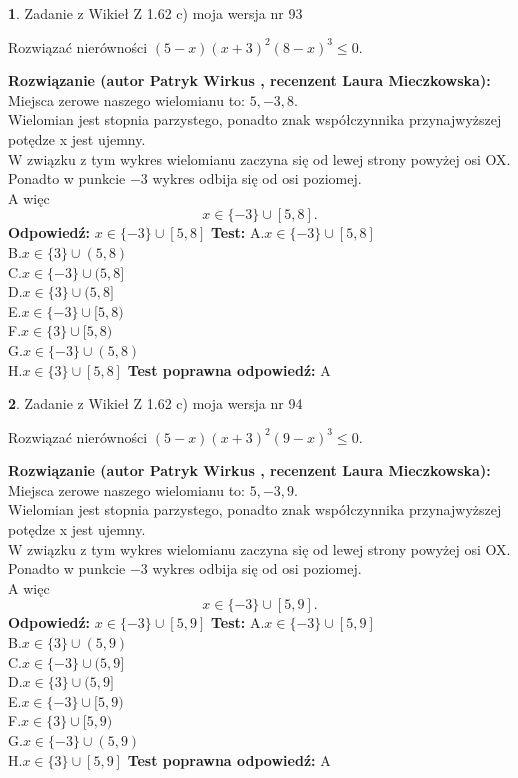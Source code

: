 \documentclass[12pt, a4paper]{article}
\theoremstyle{definition} %
\newtheorem{zad}{}
\newcommand{\zadStart}[1]{\begin{zad}#1\newline}
\newcommand{\zadStop}{\end{zad}}
\newcommand{\rozwStart}[2]{\noindent \textbf{Rozwiązanie (autor #1 , recenzent #2): }\newline}
\newcommand{\rozwStop}{\newline}
\newcommand{\odpStart}{\noindent \textbf{Odpowiedź:}\newline}
\newcommand{\odpStop}{\newline}
\newcommand{\testStart}{\noindent \textbf{Test:}\newline}
\newcommand{\testStop}{\newline}
\newcommand{\kluczStart}{\noindent \textbf{Test poprawna odpowiedź:}\newline}
\newcommand{\kluczStop}{\newline}
\begin{document}
\zadStart{Zadanie z Wikieł Z 1.62 c) moja wersja nr 93}

Rozwiązać nierówności $(5-x)(x+3)^{2}(8-x)^{3}\le0$.
\zadStop
\rozwStart{Patryk Wirkus}{Laura Mieczkowska}
Miejsca zerowe naszego wielomianu to: $5, -3, 8$.\\
Wielomian jest stopnia parzystego, ponadto znak współczynnika przy\linebreak najwyższej potędze x jest ujemny.\\ W związku z tym wykres wielomianu zaczyna się od lewej strony powyżej osi OX.\\
Ponadto w punkcie $-3$ wykres odbija się od osi poziomej.\\
A więc $$x \in \{-3\} \cup [5,8].$$
\rozwStop
\odpStart
$x \in \{-3\} \cup [5,8]$
\odpStop
\testStart
A.$x \in \{-3\} \cup [5,8]$\\
B.$x \in \{3\} \cup (5,8)$\\
C.$x \in \{-3\} \cup (5,8]$\\
D.$x \in \{3\} \cup (5,8]$\\
E.$x \in \{-3\} \cup [5,8)$\\
F.$x \in \{3\} \cup [5,8)$\\
G.$x \in \{-3\} \cup (5,8)$\\
H.$x \in \{3\} \cup [5,8]$
\testStop
\kluczStart
A
\kluczStop



\zadStart{Zadanie z Wikieł Z 1.62 c) moja wersja nr 94}

Rozwiązać nierówności $(5-x)(x+3)^{2}(9-x)^{3}\le0$.
\zadStop
\rozwStart{Patryk Wirkus}{Laura Mieczkowska}
Miejsca zerowe naszego wielomianu to: $5, -3, 9$.\\
Wielomian jest stopnia parzystego, ponadto znak współczynnika przy\linebreak najwyższej potędze x jest ujemny.\\ W związku z tym wykres wielomianu zaczyna się od lewej strony powyżej osi OX.\\
Ponadto w punkcie $-3$ wykres odbija się od osi poziomej.\\
A więc $$x \in \{-3\} \cup [5,9].$$
\rozwStop
\odpStart
$x \in \{-3\} \cup [5,9]$
\odpStop
\testStart
A.$x \in \{-3\} \cup [5,9]$\\
B.$x \in \{3\} \cup (5,9)$\\
C.$x \in \{-3\} \cup (5,9]$\\
D.$x \in \{3\} \cup (5,9]$\\
E.$x \in \{-3\} \cup [5,9)$\\
F.$x \in \{3\} \cup [5,9)$\\
G.$x \in \{-3\} \cup (5,9)$\\
H.$x \in \{3\} \cup [5,9]$
\testStop
\kluczStart
A
\kluczStop
\end{document}
